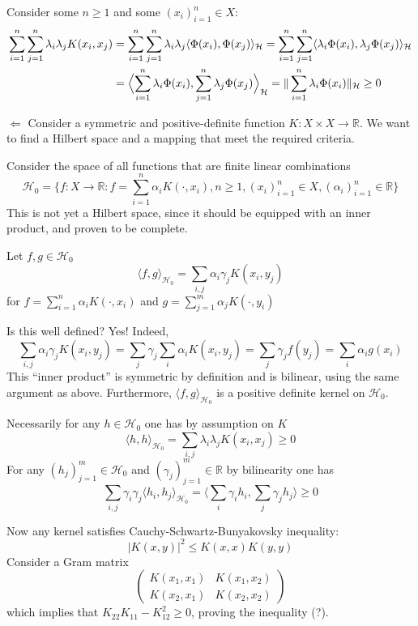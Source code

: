 \documentclass[a4paper]{article}
\newcommand{\Real}{\mathbb{R}}
\newcommand{\Hcal}{\mathcal{H}}
\begin{document}
Consider some $n\geq1$ and some $(x_i)_{i=1}^n \in X$:
\begin{align*}
	\sum_{i=1}^n \sum_{j=1}^n \lambda_i \lambda_j K(x_i, x_j) 
	&= \sum_{i=1}^n \sum_{j=1}^n \lambda_i \lambda_j \langle \Phi(x_i), \Phi(x_j)\rangle_\Hcal 
	= \sum_{i=1}^n \sum_{j=1}^n \langle \lambda_i \Phi(x_i), \lambda_j \Phi(x_j)\rangle_\Hcal \\
	&= \Bigl\langle \sum_{i=1}^n \lambda_i \Phi(x_i), \sum_{j=1}^n \lambda_j \Phi(x_j)\Bigr\rangle_\Hcal
	= \| \sum_{i=1}^n \lambda_i \Phi(x_i)\|_\Hcal
	\geq 0
\end{align*}

$\Leftarrow$ Consider a symmetric and positive-definite function $K:X\times X\to \Real$.
We want to find a Hilbert space and a mapping that meet the required criteria.

Consider the space of all functions that are finite linear combinations
\[
\Hcal_0 = \bigl\{ f : X \to \Real :
f = \sum_{i=1}^n \alpha_i K(\cdot, x_i), n\geq1,
(x_i)_{i=1}^n\in X, (\alpha_i)_{i=1}^n\in \Real \bigr\}
\]
This is not yet a Hilbert space, since it should be equipped with an inner product,
and proven to be complete.

Let $f,g\in \Hcal_0$
\[
\langle f, g \rangle_{\Hcal_0} = \sum_{i,j} \alpha_i \gamma_j K(x_i, y_j)
\]
for $f = \sum_{i=1}^n \alpha_i K(\cdot, x_i)$ and $g = \sum_{j=1}^m \alpha_j K(\cdot, y_i)$

Is this well defined? Yes! Indeed,
\[
\sum_{i,j} \alpha_i \gamma_j K(x_i, y_j)
= \sum_j \gamma_j \sum_i \alpha_i K(x_i, y_j)
= \sum_j \gamma_j f(y_j)
= \sum_i \alpha_i g(x_i)
\]
This ``inner product'' is symmetric by definition and is bilinear, using the
same argument as above. Furthermore, $\langle f, g \rangle_{\Hcal_0}$ is a
positive definite kernel on $\Hcal_0$.

Necessarily for any $h\in \Hcal_0$ one has by assumption on $K$
\[
\langle h, h \rangle_{\Hcal_0}
= \sum_{i,j} \lambda_i \lambda_j K(x_i,x_j)
\geq 0
\]
For any $(h_j)_{j=1}^m\in \Hcal_0$ and $(\gamma_j)_{j=1}^m\in \Real$ by bilinearity one has
\[
\sum_{i,j} \gamma_i \gamma_j \langle h_i, h_j \rangle_{\Hcal_0}
= \langle \sum_i \gamma_i h_i, \sum_j \gamma_j h_j \rangle \geq 0
\]

Now any kernel satisfies Cauchy-Schwartz-Bunyakovsky inequality:
\[ |K(x,y)|^2 \leq K(x,x) K(y,y) \]
Consider a Gram matrix
\[
\begin{pmatrix}
	K(x_1,x_1) & K(x_1,x_2) \\
	K(x_2,x_1) & K(x_2,x_2) 
\end{pmatrix}
\]
which implies that $K_{22}K_{11} - K^2_{12}\geq 0$, proving the inequality (?).
\end{document}
